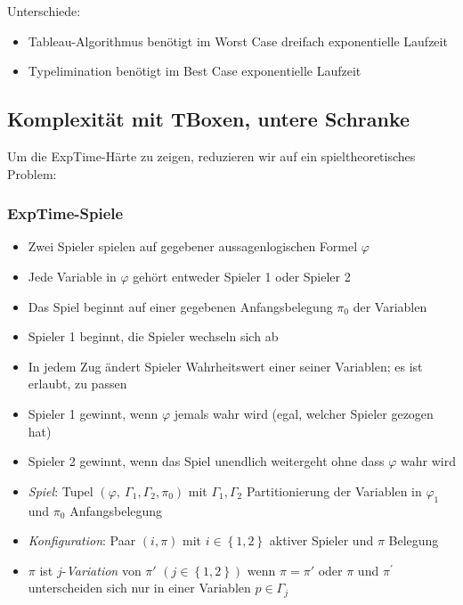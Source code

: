 Unterschiede:

\begin{itemize}
  \item Tableau-Algorithmus benötigt im Worst Case dreifach exponentielle Laufzeit
  \item Typelimination benötigt im Best Case exponentielle Laufzeit
\end{itemize}

\subsection{Komplexität mit TBoxen, untere Schranke}\label{komplexituxe4t-mit-tboxen-untere-schranke}

Um die ExpTime-Härte zu zeigen, reduzieren wir auf ein spieltheoretisches Problem:

\subsubsection{ExpTime-Spiele}\label{exptime-spiele}

\begin{itemize}
\item
  Zwei Spieler spielen auf gegebener aussagenlogischen Formel
  $\varphi$
\item
  Jede Variable in $\varphi$ gehört entweder Spieler 1 oder Spieler 2
\item
  Das Spiel beginnt auf einer gegebenen Anfangsbelegung $\pi_{0}$ der
  Variablen
\item
  Spieler 1 beginnt, die Spieler wechseln sich ab
\item
  In jedem Zug ändert Spieler Wahrheitswert einer seiner Variablen; es
  ist erlaubt, zu passen
\item
  Spieler 1 gewinnt, wenn $\varphi$ jemals wahr wird (egal, welcher
  Spieler gezogen hat)
\item
  Spieler 2 gewinnt, wenn das Spiel unendlich weitergeht ohne dass
  $\varphi$ wahr wird
\end{itemize}

\begin{definition}

\begin{itemize}
\item
  \emph{Spiel}: Tupel
  $\left( \varphi,\ \Gamma_{1},\Gamma_{2},\pi_{0} \right)$ mit
  $\Gamma_{1},\Gamma_{2}$ Partitionierung der Variablen in
  $\varphi_{1}$ und $\pi_{0}$ Anfangsbelegung
\item
  \emph{Konfiguration}: Paar $(i,\pi)$ mit
  $i \in \left\{ 1,2 \right\}$ aktiver Spieler und $\pi$ Belegung
\item
  $\pi$ ist $j$-\emph{Variation} von $\pi'$
  $\left( j \in \left\{ 1,2 \right\} \right)$ wenn $\pi = \pi'$ oder
  $\pi$ und $\pi^{'}$ unterscheiden sich nur in einer Variablen
  $p \in \Gamma_{j}$
\end{itemize}
\end{definition}

